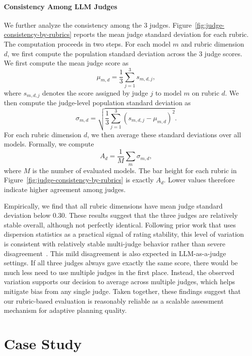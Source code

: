\documentclass{llmxive}
\begin{document}
\paragraph{Consistency Among LLM Judges}
We further analyze the consistency among the 3 judges.
Figure~\ref{fig:judge-consistency-by-rubrics} reports the mean judge standard deviation for each rubric.
The computation proceeds in two steps.
For each model $m$ and rubric dimension $d$, we first compute the population standard deviation across the 3 judge scores.
We first compute the mean judge score as
\[
\mu_{m,d} = \frac{1}{3} \sum_{j=1}^{3} s_{m,d,j},
\]
where $s_{m,d,j}$ denotes the score assigned by judge $j$ to model $m$ on rubric $d$.
We then compute the judge-level population standard deviation as
\[
\sigma_{m,d} = \sqrt{\frac{1}{3} \sum_{j=1}^{3} \left(s_{m,d,j} - \mu_{m,d}\right)^2 }.
\]
For each rubric dimension $d$, we then average these standard deviations over all models.
Formally, we compute
\[
A_d = \frac{1}{M} \sum_{m} \sigma_{m,d},
\]
where $M$ is the number of evaluated models.
The bar height for each rubric in Figure~\ref{fig:judge-consistency-by-rubrics} is exactly $A_d$.
Lower values therefore indicate higher agreement among judges.


Empirically, we find that all rubric dimensions have mean judge standard deviation below 0.30.
These results suggest that the three judges are relatively stable overall, although not perfectly identical.
Following prior work that uses dispersion statistics as a practical signal of rating stability, this level of variation is consistent with relatively stable multi-judge behavior rather than severe disagreement~\citep{chang2025development,Wei2025,alakaloko2019determination}.
This mild disagreement is also expected in LLM-as-a-judge settings.
If all three judges always gave exactly the same score, there would be much less need to use multiple judges in the first place.
Instead, the observed variation supports our decision to average across multiple judges, which helps mitigate bias from any single judge.
Taken together, these findings suggest that our rubric-based evaluation is reasonably reliable as a scalable assessment mechanism for adaptive planning quality.





\section{Case Study}
\label{app:case-error-study}
\end{document}
